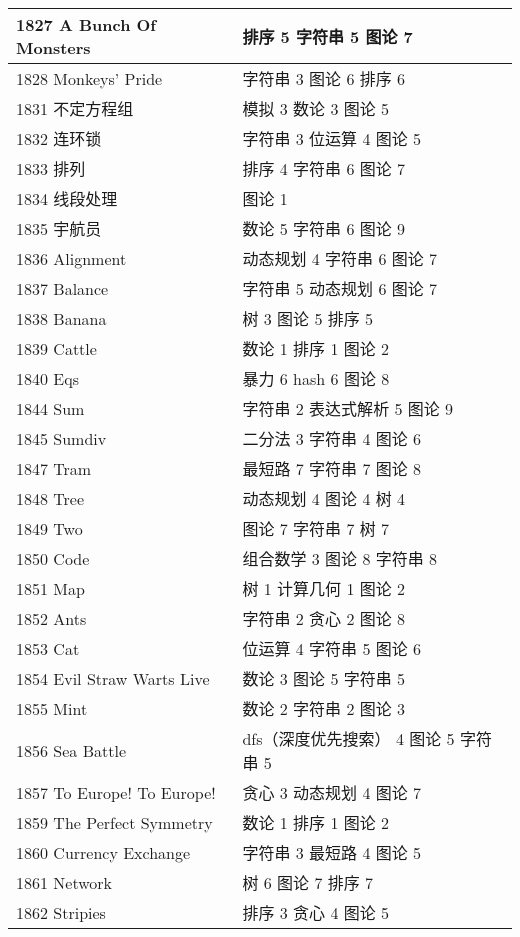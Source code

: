 \begin{longtable}{| p{} | p{} |}
 1827 A Bunch Of Monsters  & 排序 5 字符串 5 图论 7 \\ \hline
 1828 Monkeys' Pride  & 字符串 3 图论 6 排序 6 \\ \hline
 1831 不定方程组  & 模拟 3 数论 3 图论 5 \\ \hline
 1832 连环锁  & 字符串 3 位运算 4 图论 5 \\ \hline
 1833 排列  & 排序 4 字符串 6 图论 7 \\ \hline
 1834 线段处理  & 图论 1 \\ \hline
 1835 宇航员  & 数论 5 字符串 6 图论 9 \\ \hline
 1836 Alignment  & 动态规划 4 字符串 6 图论 7 \\ \hline
 1837 Balance  & 字符串 5 动态规划 6 图论 7 \\ \hline
 1838 Banana  & 树 3 图论 5 排序 5 \\ \hline
 1839 Cattle  & 数论 1 排序 1 图论 2 \\ \hline
 1840 Eqs  & 暴力 6 hash 6 图论 8 \\ \hline
 1844 Sum  & 字符串 2 表达式解析 5 图论 9 \\ \hline
 1845 Sumdiv  & 二分法 3 字符串 4 图论 6 \\ \hline
 1847 Tram  & 最短路 7 字符串 7 图论 8 \\ \hline
 1848 Tree  & 动态规划 4 图论 4 树 4 \\ \hline
 1849 Two  & 图论 7 字符串 7 树 7 \\ \hline
 1850 Code  & 组合数学 3 图论 8 字符串 8 \\ \hline
 1851 Map  & 树 1 计算几何 1 图论 2 \\ \hline
 1852 Ants  & 字符串 2 贪心 2 图论 8 \\ \hline
 1853 Cat  & 位运算 4 字符串 5 图论 6 \\ \hline
 1854 Evil Straw Warts Live  & 数论 3 图论 5 字符串 5 \\ \hline
 1855 Mint  & 数论 2 字符串 2 图论 3 \\ \hline
 1856 Sea Battle  & dfs（深度优先搜索） 4 图论 5 字符串 5 \\ \hline
 1857 To Europe! To Europe!  & 贪心 3 动态规划 4 图论 7 \\ \hline
 1859 The Perfect Symmetry  & 数论 1 排序 1 图论 2 \\ \hline
 1860 Currency Exchange  & 字符串 3 最短路 4 图论 5 \\ \hline
 1861 Network  & 树 6 图论 7 排序 7 \\ \hline
 1862 Stripies  & 排序 3 贪心 4 图论 5 \\ \hline

\end{longtable}
